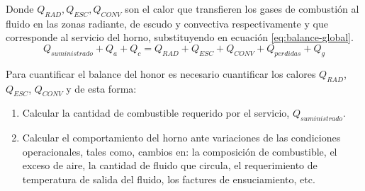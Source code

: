 \par Donde $Q_{RAD}, Q_{ESC}, Q_{CONV}$ son el calor que transfieren los gases de combustión al fluido en las zonas radiante, de escudo y convectiva respectivamente y que corresponde al servicio del horno, substituyendo en ecuación \ref{eq:balance-global}.
\begin{equation}
    Q_{suministrado} + Q_{a} + Q_{c} = Q_{RAD} + Q_{ESC} + Q_{CONV} + Q_{perdidas} + Q_{g}
\end{equation}
\par Para cuantificar el balance del honor es necesario cuantificar los calores $Q_{RAD}$, $Q_{ESC}$, $Q_{CONV}$ y de esta forma:
\begin{enumerate}
    \item Calcular la cantidad de combustible requerido por el servicio, $Q_{suministrado}$.
    \item Calcular el comportamiento del horno ante variaciones de las condiciones operacionales, tales como, cambios en: la composición de combustible, el exceso de aire, la cantidad de fluido que circula, el requerimiento de temperatura de salida del fluido, los factures de ensuciamiento, etc.
\end{enumerate}

